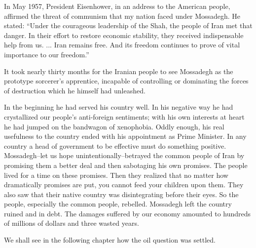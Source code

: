 In May 1957, President Eisenhower, in an address to the American people, affirmed the threat of communism that my nation faced under Mossadegh. He stated: “Under the courageous leadership of the Shah, the people of Iran met that danger. In their effort to restore economic stability, they received indispensable help from us. ... Iran remains free. And its freedom continues to prove of vital importance to our freedom.” 

It took nearly thirty months for the Iranian people to see Mossadegh as the prototype sorcerer’s apprentice, incapable of controlling or dominating the forces of destruction which he himself had unleashed. 

In the beginning he had served his country well. In his negative way he had crystallized our people's anti-foreign sentiments; with his own interests at heart he had jumped on the bandwagon of xenophobia. Oddly enough, his real usefulness to the country ended with his appointment as Prime Minister. In any country a head of government to be effective must do something positive. Mossadegh--let us hope unintentionally--betrayed the common people of Iran by promising them a better deal and then sabotaging his own promises. The people lived for a time on these promises. Then they realized that no matter how dramatically promises are put, you cannot feed your children upon them. They also saw that their native country was disintegrating before their eyes. So the people, especially the common people, rebelled. Mossadegh left the country ruined and in debt. The damages suffered by our economy amounted to hundreds of millions of dollars and three wasted years. 

We shall see in the following chapter how the oil question was settled. 